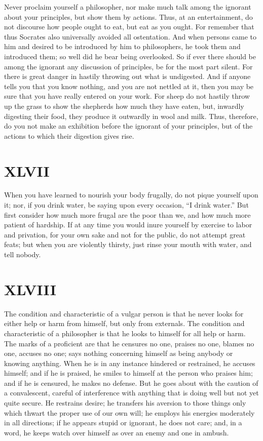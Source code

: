 \documentclass[11pt]{article}
\begin{document}
Never proclaim yourself a philosopher, nor make much talk among the ignorant about your principles, but show them by actions. Thus, at an entertainment, do not discourse how people ought to eat, but eat as you ought. For remember that thus Socrates also universally avoided all ostentation. And when persons came to him and desired to be introduced by him to philosophers, he took them and introduced them; so well did he bear being overlooked. So if ever there should be among the ignorant any discussion of principles, be for the most part silent. For there is great danger in hastily throwing out what is undigested. And if anyone tells you that you know nothing, and you are not nettled at it, then you may be sure that you have really entered on your work. For sheep do not hastily throw up the grass to show the shepherds how much they have eaten, but, inwardly digesting their food, they produce it outwardly in wool and milk. Thus, therefore, do you not make an exhibition before the ignorant of your principles, but of the actions to which their digestion gives rise.
\section*{XLVII}

When you have learned to nourish your body frugally, do not pique yourself upon it; nor, if you drink water, be saying upon every occasion, “I drink water.” But first consider how much more frugal are the poor than we, and how much more patient of hardship. If at any time you would inure yourself by exercise to labor and privation, for your own sake and not for the public, do not attempt great feats; but when you are violently thirsty, just rinse your mouth with water, and tell nobody.
\section*{XLVIII}

The condition and characteristic of a vulgar person is that he never looks for either help or harm from himself, but only from externals. The condition and characteristic of a philosopher is that he looks to himself for all help or harm. The marks of a proficient are that he censures no one, praises no one, blames no one, accuses no one; says nothing concerning himself as being anybody or knowing anything. When he is in any instance hindered or restrained, he accuses himself; and if he is praised, he smiles to himself at the person who praises him; and if he is censured, he makes no defense. But he goes about with the caution of a convalescent, careful of interference with anything that is doing well but not yet quite secure. He restrains desire; he transfers his aversion to those things only which thwart the proper use of our own will; he employs his energies moderately in all directions; if he appears stupid or ignorant, he does not care; and, in a word, he keeps watch over himself as over an enemy and one in ambush.
\end{document}
